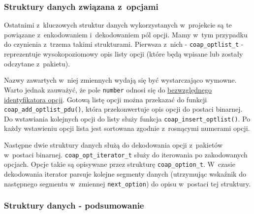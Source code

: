 \subsubsection{Struktury danych związana z~opcjami}

Ostatnimi z~kluczowych struktur danych wykorzystanych w~projekcie są te powiązane z~enkodowaniem i~dekodowaniem pól opcji. Mamy w~tym przypadku do czynienia z~trzema takimi strukturami. Pierwsza z~nich - \verb|coap_optlist_t| - reprezentuje wysokopoziomowy opis listy opcji (które będą wpisane lub zostały odczytane z~pakietu).

\vspace{0.5cm}

\vspace{0.5cm}

Nazwy zawartych w~niej zmiennych wydają się być wystarczająco wymowne. Warto jednak zauważyć, że pole \verb|number| odnosi się do \underline{bezwzględnego identyfikatora opcji}. Gotową listę opcji można przekazać do funkcji \verb|coap_add_optlist_pdu()|, która przekonwertuje opis opcji do postaci binarnej. Do wstawiania kolejnych opcji do listy służy funkcja \verb|coap_insert_optlist()|. Po każdy wstawieniu opcji lista jest sortowana zgodnie z~rosnącymi numerami opcji. 

\vspace{0.5cm}

\vspace{0.5cm}

Następne dwie struktury danych służą do dekodowania opcji z~pakietów w~postaci binarnej. \verb|coap_opt_iterator_t| służy do iterowania po zakodowanych opcjach. Opcje takie są opisywane przez strukturę \verb|coap_option_t|. W~czasie dekodowania iterator parsuje kolejne segmenty danych (utrzymując wskaźnik do następnego segmentu w~zmiennej \verb|next_option|) do opisu w~postaci tej struktury.

\vspace{0.5cm}

\vspace{0.5cm}



\subsubsection{Struktury danych - podsumowanie}


